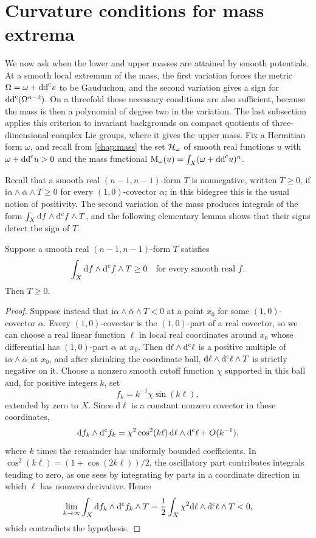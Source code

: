 \section{Curvature conditions for mass extrema}
\label{sec:mass-extremum-geometry}

We now ask when the lower and upper masses are attained by smooth potentials. At a smooth local extremum of the mass, the first variation forces the metric $\Omega=\omega+\mathrm{dd}^{\mathrm{c}} v$ to be Gauduchon, and the second variation gives a sign for $\mathrm{dd}^{\mathrm{c}}(\Omega^{n-2})$. On a threefold these necessary conditions are also sufficient, because the mass is then a polynomial of degree two in the variation. The last subsection applies this criterion to invariant backgrounds on compact quotients of three-dimensional complex Lie groups, where it gives the upper mass. Fix a Hermitian form $\omega$, and recall from \cref{chap:mass} the set $\mathcal H_\omega$ of smooth real functions $u$ with $\omega+\mathrm{dd}^{\mathrm{c}} u>0$ and the mass functional $\mathrm M_\omega(u)=\int_X(\omega+\mathrm{dd}^{\mathrm{c}} u)^n$.

Recall that a smooth real $(n-1,n-1)$-form $T$ is nonnegative, written $T\geq0$, if $\mathrm i\alpha\wedge\bar\alpha\wedge T\geq0$ for every $(1,0)$-covector $\alpha$; in this bidegree this is the usual notion of positivity. The second variation of the mass produces integrals of the form $\int_X\mathrm df\wedge\mathrm d^{\mathrm c} f\wedge T$, and the following elementary lemma shows that their signs detect the sign of $T$.

\begin{lemma}\label{lem:gradient-test-positive-form}
Suppose a smooth real $(n-1,n-1)$-form $T$ satisfies
\[
 \int_X \mathrm{d}f\wedge\mathrm d^{\mathrm c} f\wedge T\geq0
 \quad\hbox{for every smooth real }f.
\]
Then $T\geq0$.
\end{lemma}
\begin{proof}
Suppose instead that $\mathrm i\alpha\wedge\bar\alpha\wedge T<0$ at a point $x_0$ for some $(1,0)$-covector $\alpha$. Every $(1,0)$-covector is the $(1,0)$-part of a real covector, so we can choose a real linear function $\ell$ in local real coordinates around $x_0$ whose differential has $(1,0)$-part $\alpha$ at $x_0$. Then $\mathrm{d}\ell\wedge\mathrm d^{\mathrm c}\ell$ is a positive multiple of $\mathrm i\alpha\wedge\bar\alpha$ at $x_0$, and after shrinking the coordinate ball, $\mathrm{d}\ell\wedge\mathrm d^{\mathrm c}\ell\wedge T$ is strictly negative on it. Choose a nonzero smooth cutoff function $\chi$ supported in this ball and, for positive integers $k$, set
\[
 f_k=k^{-1}\chi\sin(k\ell),
\]
extended by zero to $X$. Since $\mathrm{d}\ell$ is a constant nonzero covector in these coordinates,
\[
 \mathrm{d}f_k\wedge\mathrm d^{\mathrm c} f_k
 =\chi^2\cos^2(k\ell)\,\mathrm{d}\ell\wedge\mathrm d^{\mathrm c}\ell+O(k^{-1}),
\]
where $k$ times the remainder has uniformly bounded coefficients. In $\cos^2(k\ell)=(1+\cos(2k\ell))/2$, the oscillatory part contributes integrals tending to zero, as one sees by integrating by parts in a coordinate direction in which $\ell$ has nonzero derivative. Hence
\[
 \lim_{k\to\infty}\int_X\mathrm{d}f_k\wedge\mathrm d^{\mathrm c} f_k\wedge T
 =\frac12\int_X\chi^2\mathrm{d}\ell\wedge\mathrm d^{\mathrm c}\ell\wedge T<0,
\]
which contradicts the hypothesis.
\end{proof}

